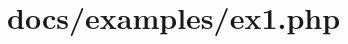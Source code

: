 \hypertarget{docs_2examples_2ex1_8php-example}{
\section{docs/examples/ex1.\-php}
}

\begin{DoxyCodeInclude}
\end{DoxyCodeInclude}
 